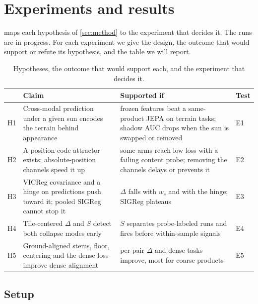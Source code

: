 \section{Experiments and results}
\label{sec:experiments}

\newcommand{\pend}{--}

 maps each hypothesis of \cref{sec:method} to the experiment that decides it. The runs are in progress. For each experiment we give the design, the outcome that would support or refute its hypothesis, and the table we will report.

\begin{table}[t]
  \centering
  \footnotesize
  \setlength{\tabcolsep}{4pt}
  \caption{Hypotheses, the outcome that would support each, and the experiment that decides it.}
  \label{tab:hypotheses}
  \begin{tabular}{@{}lp{6.2cm}p{8.4cm}l@{}}
    \toprule
    & Claim & Supported if & Test \\
    \midrule
    H1 & Cross-modal prediction under a given sun encodes the terrain behind appearance & frozen features beat a same-product JEPA on terrain tasks; shadow AUC drops when the sun is swapped or removed & E1 \\
    H2 & A position-code attractor exists; absolute-position channels speed it up & some arms reach low loss with a failing content probe; removing the channels delays or prevents it & E2 \\
    H3 & VICReg covariance and a hinge on predictions push toward it; pooled SIGReg cannot stop it & $\Delta$ falls with $w_c$ and with the hinge; SIGReg plateaus & E3 \\
    H4 & Tile-centered $\Delta$ and $S$ detect both collapse modes early & $S$ separates probe-labeled runs and fires before within-sample signals & E4 \\
    H5 & Ground-aligned stems, floor, centering and the dense loss improve dense alignment & per-pair $\Delta$ and dense tasks improve, most for coarse products & E5 \\
    \bottomrule
  \end{tabular}
\end{table}

\subsection{Setup}
\label{sec:setup}

